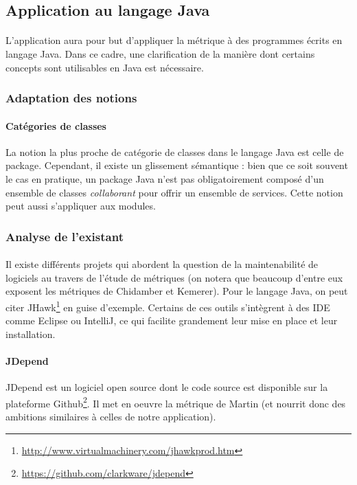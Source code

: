 \documentclass{scrartcl}
\begin{document}
\subsection{Application au langage Java}

    \paragraph{}L'application aura pour but d'appliquer la métrique à des programmes écrits en langage Java. Dans ce cadre, une clarification de la manière dont certains concepts sont utilisables en Java est nécessaire.

\subsubsection{Adaptation des notions}

    \paragraph{Catégories de classes}La notion la plus proche de catégorie de classes dans le langage Java est celle de package. Cependant, il existe un glissement sémantique : bien que ce soit souvent le cas en pratique, un package Java n'est pas obligatoirement composé d'un ensemble de classes \emph{collaborant} pour offrir un ensemble de services. Cette notion peut aussi s'appliquer aux modules.

\subsubsection{Analyse de l'existant}
    \paragraph{}Il existe différents projets qui abordent la question de la maintenabilité de logiciels au travers de l'étude de métriques (on notera que beaucoup d'entre eux exposent les métriques de Chidamber et Kemerer\cite{ChidamberKemerer:1994}). Pour le langage Java, on peut citer JHawk\footnote{\url{http://www.virtualmachinery.com/jhawkprod.htm}} en guise d'exemple. Certains de ces outils s'intègrent à des IDE comme Eclipse ou IntelliJ, ce qui facilite grandement leur mise en place et leur installation.
    
    \paragraph{JDepend}JDepend est un logiciel open source dont le code source est disponible sur la plateforme Github\footnote{\url{https://github.com/clarkware/jdepend}}. Il met en oeuvre la métrique de Martin (et nourrit donc des ambitions similaires à celles de notre application).
\end{document}
